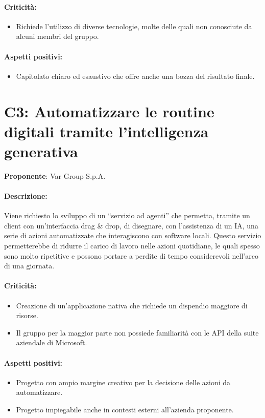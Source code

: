 \documentclass{TWDocumentFull}
\begin{document}
    \paragraph{Criticità:}
    \begin{itemize}
        \item Richiede l'utilizzo di diverse tecnologie, molte delle quali non conosciute da alcuni membri del gruppo.
    \end{itemize}
    \paragraph{Aspetti positivi:}
    \begin{itemize}
        \item Capitolato chiaro ed esaustivo che offre anche una bozza del risultato finale.
    \end{itemize}

    \newpage\section*{C3: Automatizzare le routine digitali tramite l'intelligenza generativa}
    {\textbf{Proponente}: Var Group S.p.A.}
    \paragraph{Descrizione:\\}
    {Viene richiesto lo sviluppo di un “servizio ad agenti” che permetta, tramite un client con un'interfaccia drag \& drop, di disegnare, con l'assistenza di un IA, una serie di azioni automatizzate che interagiscono con software locali. Questo servizio permetterebbe di ridurre il carico di lavoro nelle azioni quotidiane, le quali spesso sono molto ripetitive e possono portare a perdite di tempo considerevoli nell'arco di una giornata.}
    \paragraph{Criticità:}
    \begin{itemize}
        \item Creazione di un'applicazione nativa che richiede un dispendio maggiore di risorse.
        \item Il gruppo per la maggior parte non possiede familiarità con le API della suite aziendale di Microsoft.
    \end{itemize}
    \paragraph{Aspetti positivi:}
    \begin{itemize}
        \item Progetto con ampio margine creativo per la decisione delle azioni da automatizzare.
        \item Progetto impiegabile anche in contesti esterni all'azienda proponente.
    \end{itemize}
\end{document}
